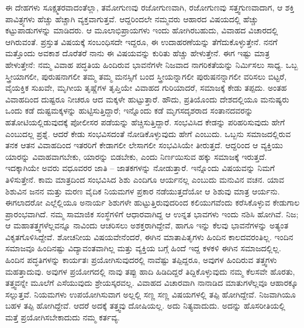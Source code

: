 ಈ ದೇಹಗಳು ಸೂಕ್ಷ್ಮತರವಾದಂತೆಲ್ಲಾ, ತಮೋಗುಣವು ರಜೋಗುಣವಾಗಿ, ರಜೋಗುಣವು ಸತ್ತ್ವಗುಣವಾದಾಗ, ಆ ಶಕ್ತಿ ಪಾವಿತ್ರ್ಯಗಳು ಹೆಚ್ಚು ಹೆಚ್ಚಾಗಿ ವ್ಯಕ್ತವಾಗುತ್ತವೆ. ಆದ್ದರಿಂದಲೇ ನಮ್ಮವರು ಆಹಾರದ ವಿಷಯದಲ್ಲಿ ಹೆಚ್ಚು ಕಟ್ಟುಪಾಡುಗಳನ್ನು ಮಾಡಿದರು. ಆ ಮೂಲಾಭಿಪ್ರಾಯಗಳು ಇಂದು ಹೋಗಿರಬಹುದು, ವಿವಾಹದ ವಿಚಾರದಲ್ಲಿ ಆಗಿರುವಂತೆ. ಪ್ರಸ್ತುತ ವಿಷಯಕ್ಕೆ ಸಂಬಂಧಿಸದೇ ಇದ್ದರೂ, ಈ ಉದಾಹರಣೆಯನ್ನು ತೆಗೆದುಕೊಳ್ಳುತ್ತೇನೆ. ನನಗೆ ಮತ್ತೊಂದು ಅವಕಾಶ ದೊರೆತರೆ ನಾನು ಈ ವಿಷಯವನ್ನು ಕುರಿತು ಹೆಚ್ಚು ಹೇಳುತ್ತೇನೆ. ಈಗ ಇಷ್ಟು ಮಾತ್ರ ಹೇಳುತ್ತೇನೆ: ನಮ್ಮ ವಿವಾಹ ಪದ್ಧತಿಯ ಹಿಂದಿರುವ ಭಾವನೆಗಳೇ ನಿಜವಾದ ನಾಗರಿಕತೆಯನ್ನು ನಿರ್ಮಿಸಲು ಸಾಧ್ಯ. ಒಬ್ಬ ಸ್ತ್ರೀಯಾಗಲೀ, ಪುರುಷನಾಗಲೀ ತಮ್ಮ ತಮ್ಮ ಮನಸ್ಸಿಗೆ ಬಂದ ಸ್ತ್ರೀಯನ್ನಾಗಲೀ ಪುರುಷನನ್ನಾಗಲೀ ವರಿಸಲು ಬಿಟ್ಟರೆ, ವೈಯಕ್ತಿಕ ಸುಖವೇ, ಮೃಗೀಯ ತೃಷ್ಣೆಗಳ ತೃಪ್ತಿಯೇ ವಿವಾಹದ ಗುರಿಯಾದರೆ, ಸಮಾಜಕ್ಕೆ ಕೇಡು ತಪ್ಪದು. ಅಂತಹ ವಿವಾಹದಿಂದ ದುಷ್ಟರೂ ನೀಚರೂ ಆದ ಮಕ್ಕಳೇ ಹುಟ್ಟುತ್ತಾರೆ. ಹೌದು, ಪ್ರತಿಯೊಂದು ದೇಶದಲ್ಲಿಯೂ ಮನುಷ್ಯರು ಒಂದು ಕಡೆ ದುಷ್ಟಮಕ್ಕಳನ್ನು ಹುಟ್ಟಿಸುತ್ತಿದ್ದಾರೆ; ಇನ್ನೊಂದು ಕಡೆ ಮೃಗ\break ಸದೃಶರಾದ ಸಂತಾನದವರನ್ನು ಹತೋಟಿಯಲ್ಲಿಡುವುದಕ್ಕೆ ಪೋಲೀಸರ ಪಡೆಯನ್ನು ಹೆಚ್ಚಿಸುತ್ತಿದ್ದಾರೆ. ಸಂಭವಿಸಿದ ಕೇಡನ್ನು ಪರಿಹರಿಸುವುದು ಹೇಗೆ ಎಂಬುದಲ್ಲ ಪ್ರಶ್ನೆ. ಆದರೆ ಕೇಡು ಸಂಭವಿಸದಂತೆ ನೋಡಿಕೊಳ್ಳುವುದು ಹೇಗೆ ಎಂಬುದು. ಒಬ್ಬನು ಸಮಾಜದಲ್ಲಿರುವ ತನಕ ಆತನ ವಿವಾಹದಿಂದ ಇತರರಿಗೆ ಕೇಡಾಗಲೀ ಲೇಸಾಗಲೀ ಸಂಭವಿಸಿಯೇ ತೀರುತ್ತದೆ. ಆದ್ದರಿಂದ ಆ ವ್ಯಕ್ತಿಯು ಯಾರನ್ನು ವಿವಾಹವಾಗಬೇಕು, ಯಾರನ್ನು ಬಿಡಬೇಕು, ಎಂದು ನಿರ್ಣಯಿಸುವ ಹಕ್ಕು ಸಮಾಜಕ್ಕೆ ಇರುತ್ತದೆ. ಇದಕ್ಕಾಗಿಯೇ ಅವರು ವಧೂವರರ ಜಾತಿ – ಜಾತಕಗಳನ್ನು ನೋಡುತ್ತಾರೆ. ಇನ್ನೊಂದು ವಿಷಯವನ್ನು ನಿಮಗೆ ತಿಳಿಸುತ್ತೇನೆ. ಕಾಮ ಮಾತ್ರದಿಂದ ಸಂಭವಿಸಿದ ಶಿಶು ಎಂದಿಗೂ ಆರ್ಯನಲ್ಲ ಎಂಬುದು ಮನುವಿನ ವಚನ. ಯಾವ ಶಿಶುವಿನ ಜನನ ಮತ್ತು ಮರಣ ವೈದಿಕ ನಿಯಮಗಳ ಪ್ರಕಾರ ನಡೆಯುತ್ತದೆಯೋ ಆ ಶಿಶುವು ಮಾತ್ರ ಆರ್ಯನು. ಈಗಲಾದರೋ ಎಲ್ಲೆಲ್ಲಿಯೂ ಅನಾರ್ಯ ಶಿಶುಗಳೇ ಹುಟ್ಟುತ್ತಿರುವುದರಿಂದ ಕಲಿಯುಗವೆಂದು ಕರೆಸಿಕೊಳ್ಳುವ ಕೇಡುಗಾಲ ಪ್ರಾರಂಭವಾಗಿದೆ. ನಮ್ಮ ಸಾಮಾಜಿಕ ಸಂಸ್ಥೆಗಳಿಗೆ ಆಧಾರವಾಗಿದ್ದ ಆ ಉನ್ನತ ಭಾವಗಳು ಇಂದು ನಶಿಸಿ ಹೋಗಿವೆ. ನಿಜ; ಆ ಮಹಾತತ್ತ್ವಗಳೆಲ್ಲವನ್ನೂ ನಾವಿಂದು ಆಚರಿಸಲು ಅಶಕ್ತರಾಗಿದ್ದೇವೆ, ಹಾಗೂ ಇನ್ನು ಕೆಲವು ಭಾವನೆಗಳನ್ನು ಅತ್ಯಂತ ವಿಕೃತಗೊಳಿಸಿದ್ದೇವೆ. ಶೋಚನೀಯ ವಿಷಯವೇನೆಂದರೆ, ಈಗಿನ ಮಾತಾಪಿತೃಗಳು ಹಿಂದಿನ ಕಾಲದವರಂತಿಲ್ಲ. ಇಂದಿನ ಸಮಾಜವೂ ಹಿಂದಿನಷ್ಟು ವಿದ್ಯಾವಂತವಾಗಿಲ್ಲ ಮತ್ತು ವ್ಯಕ್ತಿಯ ಬಗ್ಗೆ ಹಿಂದೆ ಇದ್ದ ಕಳಕಳಿ ಈಗಿನ ಸಮಾಜದಲ್ಲಿಲ್ಲ. ಹಿಂದಿನ ಪದ್ಧತಿಗಳನ್ನು ಕಾರ್ಯತಃ ಪ್ರಯೋಗಿಸುವುದರಲ್ಲಿ ನಾವೆಷ್ಟು ತಪ್ಪಿದ್ದರೂ, ಅವುಗಳ ಹಿಂದಿರುವ ತತ್ತ್ವಗಳು ಮಹತ್ತಾದುವು. ಅವುಗಳ ಪ್ರಯೋಗದಲ್ಲಿ ನಾವು ತಪ್ಪು ಹಾದಿ ಹಿಡಿದಿದ್ದರೆ ತಿದ್ದಿಕೊಳ್ಳುವುದು ನಮ್ಮ ಕೆಲಸವೇ ಹೊರತು, ತತ್ತ್ವವನ್ನೇ ಮೂಲೆಗೆ ಎಸೆಯುವುದು ಶ್ರೇಯಸ್ಕರವಲ್ಲ. ವಿವಾಹದ ವಿಚಾರವಾಗಿ ನಾನಾಡಿದ ಮಾತುಗಳೆಲ್ಲವೂ ಆಹಾರಕ್ಕೂ ಸಲ್ಲುತ್ತವೆ. ನಿಯಮಗಳು ಉಪಯೋಗಿಸುವಾಗ ಅಲ್ಲಲ್ಲಿ ಸಣ್ಣ ಸಣ್ಣ ವಿಷಯಗಳಲ್ಲಿ ತಪ್ಪಿ ಹೋಗಿದ್ದೇವೆ. ನಿಜವಾಗಿಯೂ ಬಹಳ ತಪ್ಪಿ ಹೋಗಿದ್ದೇವೆ. ಆದರೆ ಅದಕ್ಕೆ ತತ್ತ್ವವು ದೋಷಿಯಲ್ಲ. ಅದು ನಿತ್ಯವಾದುದು. ಅದನ್ನು ಹೊಸರೀತಿಯಲ್ಲಿ ಮತ್ತೆ ಪ್ರಯೋಗಿಸಬೇಕಾದುದು ನಮ್ಮ ಕರ್ತವ್ಯ. 

